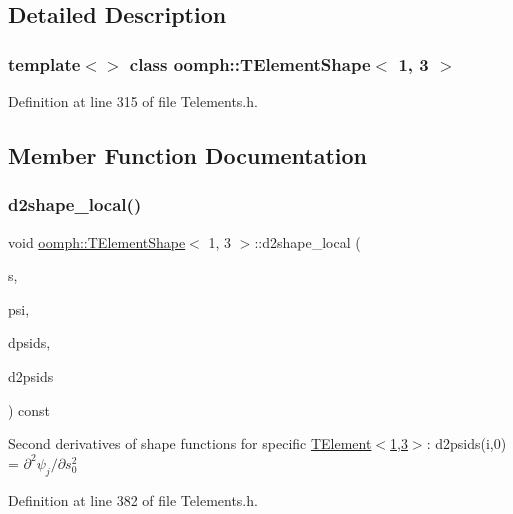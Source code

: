 \subsection{Detailed Description}
\subsubsection*{template$<$$>$\newline
class oomph\+::\+T\+Element\+Shape$<$ 1, 3 $>$}



Definition at line 315 of file Telements.\+h.



\subsection{Member Function Documentation}
\mbox{\label{classoomph_1_1TElementShape_3_011_00_013_01_4_a58380921c91e5fb9d5e3e47deb4f6354}} 
\subsubsection{\texorpdfstring{d2shape\+\_\+local()}{d2shape\_local()}}
{\footnotesize\ttfamily void \hyperlink{classoomph_1_1TElementShape}{oomph\+::\+T\+Element\+Shape}$<$ 1, 3 $>$\+::d2shape\+\_\+local (\begin{DoxyParamCaption}\item[{const \hyperlink{classoomph_1_1Vector}{Vector}$<$ double $>$ \&}]{s,  }\item[{\hyperlink{classoomph_1_1Shape}{Shape} \&}]{psi,  }\item[{\hyperlink{classoomph_1_1DShape}{D\+Shape} \&}]{dpsids,  }\item[{\hyperlink{classoomph_1_1DShape}{D\+Shape} \&}]{d2psids }\end{DoxyParamCaption}) const\hspace{0.3cm}{\ttfamily [inline]}}

Second derivatives of shape functions for specific \hyperlink{classoomph_1_1TElement}{T\+Element$<$1,3$>$}\+: d2psids(i,0) = $ \partial^2 \psi_j / \partial s_0^2 $ 

Definition at line 382 of file Telements.\+h.

